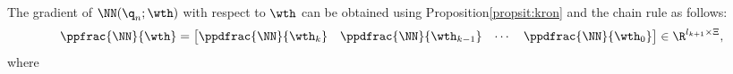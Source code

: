 \documentclass[letterpaper, journal]{IEEEtran}
\newcommand{\NNin}{\mv{x}_{nn}} %
\providecommand{\DIFadd}[1]{{\protect\color{blue}\uwave{#1}}} %
\providecommand{\DIFdel}[1]{{\protect\color{red}\sout{#1}}} %
\providecommand{\DIFaddbegin}{} %
\providecommand{\DIFaddend}{} %
\providecommand{\DIFdelbegin}{} %
\providecommand{\DIFdelend}{} %
\begin{document}
\DIFdelend The gradient of \DIFdelbegin \DIFdel{$ \NN({\q}_n;\wth)$ }\DIFdelend \DIFaddbegin \DIFadd{$ \NN(\NNin;\wth)$ }\DIFaddend with respect to $\wth$ can be obtained using Proposition\DIFaddbegin \DIFadd{~}\DIFaddend \ref{propsit:kron} and the chain rule as follows:
\DIFdelbegin %
\DIFdelend \DIFaddbegin \begin{equation}
    \ppfrac{\NN}{\wth}=
    \begin{bmatrix}
        \ppdfrac{\NN}{\wth_k}&
        \ppdfrac{\NN}{\wth_{k-1}}&
    \cdots &
        \ppdfrac{\NN}{\wth_0}
    \end{bmatrix}
    \in\R^{l_{k+1} \times \Xi}
    ,
    \label{eq:gradient:phi}
\end{equation}\DIFaddend 
where
\DIFdelbegin %
\end{document}
